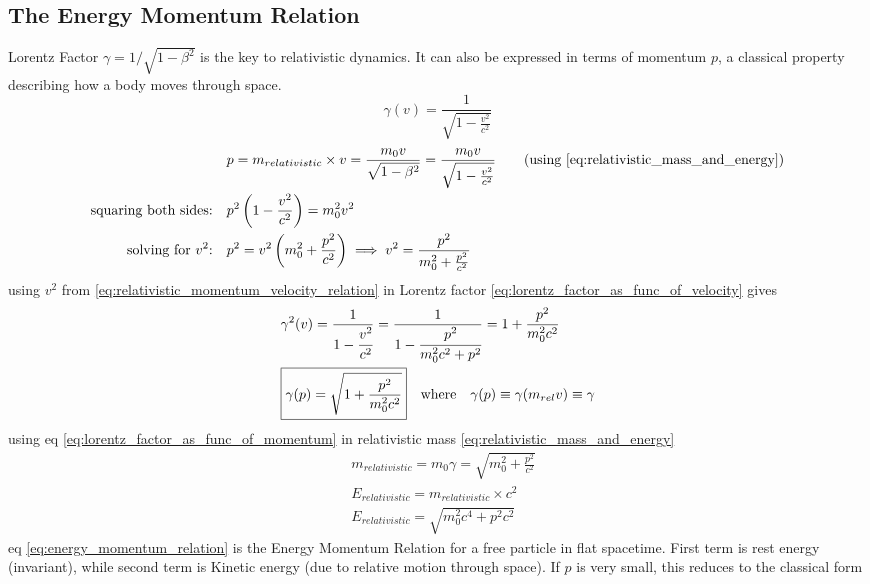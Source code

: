 \documentclass[11pt, a4paper]{article}
\begin{document}
\subsection{The Energy Momentum Relation}
Lorentz Factor $\gamma = 1/\sqrt{1 - \beta^{2}}$ is  the key to relativistic dynamics. It can also be expressed in terms of momentum $p$, a classical property describing how a body moves through space.
\begin{equation}\label{eq:lorentz_factor_as_func_of_velocity}
	\gamma(v) = \frac{1}{\sqrt{1 - \frac{v^{2}}{c^{2}}}}
\end{equation}
\begin{align}
	& p = m_{relativistic} \times v = \frac{m_{0}v}{\sqrt{1 - \beta^{2}}} = \frac{m_{0}v}{\sqrt{1 - \frac{v^{2}}{c^{2}}}} \nonumber \tag{using \eqref{eq:relativistic_mass_and_energy}} \\
	\text{squaring both sides:} \quad & p^{2}\left(1 - \frac{v^{2}}{c^{2}} \right) = m_{0}^{2}v^{2} \nonumber \\
	\text{solving for $v^{2}$:} \quad & p^{2} = v^{2} \left(m_{0}^{2} + \frac{p^{2}}{c^{2}}\right) \implies v^{2} = \frac{p^{2}}{m_{0}^{2} + \frac{p^{2}}{c^{2}}} \label{eq:relativistic_momentum_velocity_relation}
\end{align}
using $v^{2}$ from \eqref{eq:relativistic_momentum_velocity_relation} in Lorentz factor \eqref{eq:lorentz_factor_as_func_of_velocity} gives
\begin{align}
	& \gamma^{2}(v) = \frac{1}{1 - \cfrac{v^{2}}{c^{2}}} = \frac{1}{1 - \cfrac{p^{2}}{m_{0}^{2}c^{2} + p^{2}}} = 1 + \frac{p^{2}}{m_{0}^{2}c^{2}} \nonumber  \\
	& \boxed{\gamma(p) = \sqrt{1 + \frac{p^{2}}{m_{0}^{2}c^{2}}}} \quad \text{where} \quad \gamma(p) \equiv \gamma(m_{rel}v) \equiv \gamma \label{eq:lorentz_factor_as_func_of_momentum}
\end{align}
using eq \eqref{eq:lorentz_factor_as_func_of_momentum} in relativistic mass \eqref{eq:relativistic_mass_and_energy}
\begin{align}
	& m_{relativistic} = m_{0} \gamma = \sqrt{m_{0}^{2} + \frac{p^{2}}{c^{2}}} \nonumber \\
	& E_{relativistic} = m_{relativistic} \times c^{2}\nonumber \\
	& \boxed{E_{relativistic} = \sqrt{m_{0}^{2}c^{4} + p^{2}c^{2}}} \label{eq:energy_momentum_relation}
\end{align}
eq \eqref{eq:energy_momentum_relation} is the Energy Momentum Relation for a free particle in flat spacetime. First term is rest energy (invariant), while second term is Kinetic energy (due to relative motion through space). If $p$ is very small, this reduces to the classical form
\end{document}
